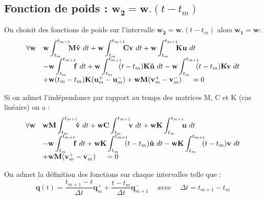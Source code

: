 \documentclass[12pt,a4paper]{report}
\begin{document}
\subsection{Fonction de poids : $\mathbf{w_2} = \mathbf{w}.(t-t_m)$}

On choisit des fonctions de poids sur l'intervalle $\mathbf{w_2} = \mathbf{w}.(t-t_m)$ alors $\mathbf{w_1} = \mathbf{w}$:
\begin{equation}
\begin{array}{r l}
	\forall \mathbf{w}
	&\displaystyle
	 \mathbf{w} \int_{t_m}^{t_{m+1}} \!\!\!
		\mathbf{M}\mathbf{\dot{v}} ~dt
	 +\mathbf{w} \int_{t_m}^{t_{m+1}} \!\!\!	
		\mathbf{C}\mathbf{v} ~dt
	 +\mathbf{w} \int_{t_m}^{t_{m+1}} \!\!\! 	
		\mathbf{K}\mathbf{u} ~dt
	\\
	  &\displaystyle
	   - \mathbf{w} \int_{t_m}^{t_{m+1}} \!\!\!
		 	\mathbf{f} ~dt		
	   + \mathbf{w} \int_{t_m}^{t_{m+1}} \!\!\! 
	    	(t-t_m)\mathbf{K}\mathbf{\dot{u}}~dt 
	    -\mathbf{w} \int_{t_m}^{t_{m+1}} \!\!\! 
	    	(t-t_m)\mathbf{K}     \mathbf{v} ~dt
	\\
	  &+ \mathbf{w} (t_m-t_m) \mathbf{K} (\mathbf{u}_m^+ - \mathbf{u}_m^-)
	   +  \mathbf{w} \mathbf{M}(\mathbf{v}_m^+ - \mathbf{v}_m^-)
	~~~~=0
\end{array}
\end{equation}

Si on admet l'indépendance par rapport au temps des matrices M, C et K (cas linéaire) on a :
\begin{equation}
\begin{array}{r l}
	\forall \mathbf{w}
	&\displaystyle
	 \mathbf{w} \mathbf{M}\int_{t_m}^{t_{m+1}} \!\!\!
		\mathbf{\dot{v}} ~dt
	 +\mathbf{w} \mathbf{C}\int_{t_m}^{t_{m+1}} \!\!\! 	
		\mathbf{v} ~dt
	 +\mathbf{w} \mathbf{K}\int_{t_m}^{t_{m+1}} \!\!\! 	
		\mathbf{u} ~dt
	\\
	  &\displaystyle
	   - \mathbf{w} \int_{t_m}^{t_{m+1}} \!\!\!
		 	\mathbf{f} ~dt	
	   + \mathbf{w} \mathbf{K}\int_{t_m}^{t_{m+1}} \!\!\!
	    	(t-t_m) \mathbf{\dot{u}}~dt 
	    -\mathbf{w} \mathbf{K}\int_{t_m}^{t_{m+1}} \!\!\! 
	    	     (t-t_m) \mathbf{v} ~dt
	\\
	  &+  \mathbf{w} \mathbf{M}(\mathbf{v}_m^+ - \mathbf{v}_m^-)
	~~~~=0
\end{array}
\end{equation}

On admet la définition des fonctions sur chaque intervalles telle que :
\begin{equation}
\mathbf{q}(t) = 
			\frac{t_{m+1}-t}{\Delta t} \mathbf{q}_m^+ + 
			\frac{t-t_m}{\Delta t} \mathbf{q}_{m+1}^-
			~~~~\text{ avec } ~~~~\Delta t = t_{m+1} - t_m
\end{equation}
\end{document}
